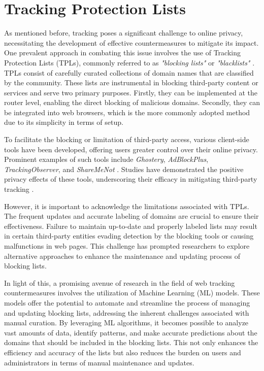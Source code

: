 \section{Tracking Protection Lists}

As mentioned before, tracking poses a significant challenge to online privacy, necessitating the development of effective countermeasures
to mitigate its impact. One prevalent approach in combating this issue involves the use of Tracking Protection Lists (TPLs),
commonly referred to as \textit{"blocking lists"} or \textit{"blacklists"} \cite{bujlow2017survey,mayer2012third}. TPLs consist of carefully curated collections of domain names
that are classified by the community. These lists are instrumental in blocking third-party content or services and serve two
primary purposes. Firstly, they can be implemented at the router level, enabling the direct blocking of malicious domains.
Secondly, they can be integrated into web browsers, which is the more commonly adopted method due to its simplicity in terms of setup.

To facilitate the blocking or limitation of third-party access, various client-side tools have been developed, offering users greater
control over their online privacy. Prominent examples of such tools include \textit{Ghostery}, \textit{AdBlockPlus}, \textit{TrackingObserver}, and \textit{ShareMeNot}
\cite{ghostery, abp, trackingObserver, shareMeNot}.
Studies have demonstrated the positive privacy effects of these tools, underscoring their efficacy in mitigating third-party tracking \cite{kontaxis2015tracking}.

However, it is important to acknowledge the limitations associated with TPLs. The frequent updates and accurate labeling of domains are crucial
to ensure their effectiveness. Failure to maintain up-to-date and properly labeled lists may result in certain third-party entities evading detection
by the blocking tools or causing malfunctions in web pages. This challenge has prompted researchers to explore alternative approaches to enhance
the maintenance and updating process of blocking lists.

In light of this, a promising avenue of research in the field of web tracking countermeasures involves the utilization of Machine Learning (ML)
models. These models offer the potential to automate and streamline the process of managing and updating blocking lists, addressing the inherent
challenges associated with manual curation. By leveraging ML algorithms, it becomes possible to analyze vast amounts of data,
identify patterns, and make accurate predictions about the domains that should be included in the blocking lists. This not only enhances the efficiency
and accuracy of the lists but also reduces the burden on users and administrators in terms of manual maintenance and updates.

